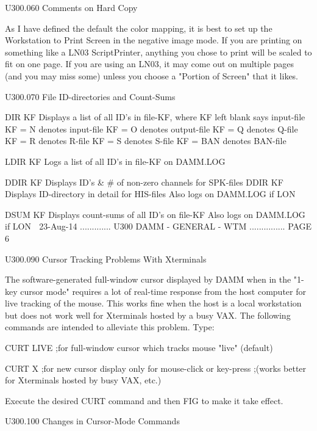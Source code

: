    U300.060  Comments on Hard Copy
 
   As I have defined the default the color mapping, it is best to set  up  the
   Workstation to Print Screen in the negative image mode. If you are printing
   on  something  like  a LN03 ScriptPrinter, anything you chose to print will
   be scaled to fit on one page. If you are using an LN03, it may come out  on
   multiple  pages  (and  you  may  miss some) unless you choose a "Portion of
   Screen" that it likes.
 
   U300.070  File ID-directories and Count-Sums
 
   DIR  KF   Displays a list of all ID's in file-KF, where
             KF   left blank says input-file
             KF = N     denotes   input-file
             KF = O     denotes  output-file
             KF = Q     denotes       Q-file
             KF = R     denotes       R-file
             KF = S     denotes       S-file
             KF = BAN   denotes     BAN-file
 
   LDIR KF   Logs a list of all ID's in file-KF on DAMM.LOG
 
   DDIR KF   Displays ID's & # of non-zero channels for SPK-files
   DDIR KF   Displays ID-directory in detail        for HIS-files
             Also logs on DAMM.LOG if LON
 
   DSUM KF   Displays count-sums of all ID's on file-KF
             Also logs on DAMM.LOG if LON
    
   23-Aug-14 ............. U300  DAMM - GENERAL - WTM ............... PAGE   6
 
   U300.090  Cursor Tracking Problems With Xterminals
 
   The software-generated full-window cursor displayed by  DAMM  when  in  the
   "1-key  cursor  mode"  requires  a  lot of real-time response from the host
   computer for live tracking of the mouse. This works fine when the  host  is
   a  local workstation but does not work well for Xterminals hosted by a busy
   VAX. The following commands are intended to alleviate this problem. Type:
 
   CURT LIVE  ;for full-window cursor which tracks mouse "live" (default)
 
   CURT X     ;for new cursor display only for mouse-click or key-press
              ;(works better for Xterminals hosted by busy VAX, etc.)
 
   Execute the desired CURT command and then FIG to make it take effect.
 
   U300.100  Changes in Cursor-Mode Commands
 
